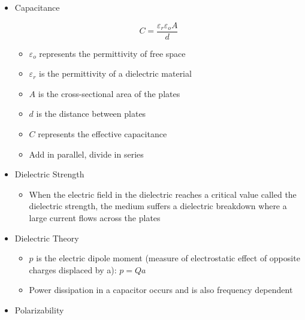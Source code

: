 \begin{itemize}

  \item Capacitance

    $$C=\frac{\varepsilon_r\varepsilon_oA}{d}$$

    \begin{itemize}

      \item $\varepsilon_o$ represents the permittivity of free space

      \item $\varepsilon_r$ is the permittivity of a dielectric material

      \item $A$ is the cross-sectional area of the plates

      \item $d$ is the distance between plates

      \item $C$ represents the effective capacitance

      \item Add in parallel, divide in series

    \end{itemize}

  \item Dielectric Strength

    \begin{itemize}

      \item When the electric field in the dielectric reaches a critical value called the dielectric strength, the medium suffers a dielectric breakdown where a large current flows across the plates

    \end{itemize}

  \item Dielectric Theory

    \begin{itemize}

      \item $p$ is the electric dipole moment (measure of electrostatic effect of opposite charges displaced by a): $p=Qa$

      \item Power dissipation in a capacitor occurs and is also frequency dependent

    \end{itemize}

  \item Polarizability


\end{itemize}
